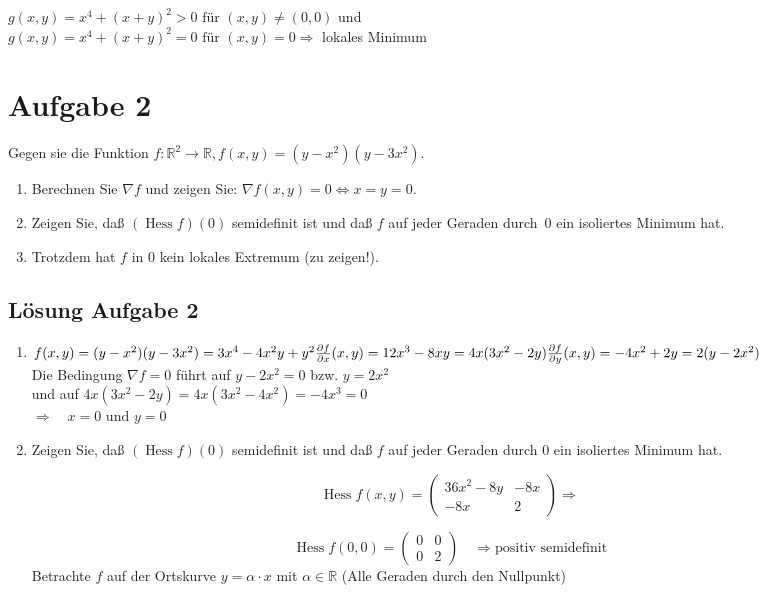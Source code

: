 \documentclass[ngerman, a4paper]{scrartcl}
\DeclareMathOperator{\Hessian}{Hess}
\newcommand{\partderf}[1]{\tfrac{\partial f}{\partial #1}}
\begin{document}
\begin{enumerate}[\textbf{\alph*)}]
		$g(x,y) = x^4 + (x + y)^2 > 0 \text{ für } (x,y) \ne (0,0)$ und\\
		$g(x,y) = x^4 + (x + y)^2 = 0 \text{ für } (x,y) = 0 \Rightarrow$ lokales Minimum
		
		\section*{Aufgabe 2}
		Gegen sie die Funktion $f: \mathbb{R}^2 \rightarrow \mathbb{R}, f(x,y) = (y-x^2)(y-3x^2).$
		\begin{enumerate}[\textbf{\alph*)}]
			\item Berechnen Sie $\nabla f$ und zeigen Sie: $\nabla f(x,y) = 0 \Leftrightarrow x = y = 0$.
			\item Zeigen Sie, daß $(\Hessian f)(0)$ semidefinit ist und daß $f$ auf jeder Geraden durch~0 ein isoliertes Minimum hat.
			\item Trotzdem hat $f$ in 0 kein lokales Extremum (zu zeigen!).
		\end{enumerate}
	
		\subsection*{Lösung Aufgabe 2}
		\begin{enumerate}[\textbf{\alph*)}]
			\item 
			$
			f(x,y) = (y-x^2)(y-3x^2) = 3x^4 - 4x^2y + y^2\\
			\partderf{x}(x,y) = 12x^3 - 8xy = 4x(3x^2 - 2y)\\
			\partderf{y}(x,y) = -4x^2 + 2y = 2(y - 2x^2)
			$
			\\
			
			Die Bedingung $\nabla f = 0$ führt auf $y - 2x^2 = 0$ bzw. $y = 2x^2$\\
			und auf $4x(3x^2 - 2y)  = 4x(3x^2 - 4x^2) = -4x^3 = 0$\\
			$\Rightarrow \quad x = 0 \text{ und } y = 0$
			
			\item 
			Zeigen Sie, daß $(\Hessian f)(0)$ semidefinit ist und daß $f$ auf jeder Geraden durch 0 ein isoliertes Minimum hat.
			
			\[
				\Hessian f(x,y) = 
				\begin{pmatrix}
					36x^2 - 8y & -8x\\
					-8x & 2
				\end{pmatrix}
				\Rightarrow
			\]
			
			\[
				\Hessian f(0,0) = 
				\begin{pmatrix}
					0 & 0\\
					0 & 2
				\end{pmatrix}
				\quad \Rightarrow \text{positiv semidefinit}
			\]
			Betrachte $f$ auf der Ortskurve $y = \alpha \cdot x $ mit $\alpha \in \mathbb{R}$ (Alle Geraden durch den Nullpunkt)
			

\end{enumerate}
\end{enumerate}
\end{document}
